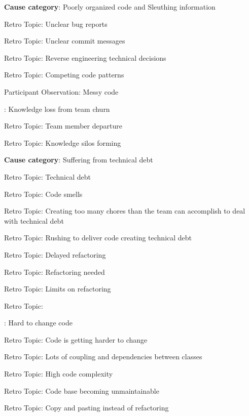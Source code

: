 \quad \quad \textbf{Cause category}: Poorly organized code and Sleuthing information

\quad \quad \quad Retro Topic: Unclear bug reports

\quad \quad \quad Retro Topic: Unclear commit messages

\quad \quad \quad Retro Topic: Reverse engineering technical decisions

\quad \quad \quad Retro Topic: Competing code patterns

\quad \quad \quad Participant Observation: Messy code

\quad \quad {}: Knowledge loss from team churn

\quad \quad \quad Retro Topic: Team member departure

\quad \quad \quad Retro Topic: Knowledge silos forming

\quad \quad \textbf{Cause category}: Suffering from technical debt

\quad \quad \quad Retro Topic: Technical debt

\quad \quad \quad Retro Topic: Code smells

\quad \quad \quad Retro Topic: Creating too many chores than the team can accomplish to deal with technical debt

\quad \quad \quad Retro Topic: Rushing to deliver code creating technical debt

\quad \quad \quad \quad Retro Topic: Delayed refactoring

\quad \quad \quad \quad Retro Topic: Refactoring needed 

\quad \quad \quad \quad Retro Topic: Limits on refactoring

\quad \quad \quad \quad Retro Topic: 

\quad \quad {}: Hard to change code

\quad \quad \quad \quad Retro Topic: Code is getting harder to change

\quad \quad \quad \quad Retro Topic: Lots of coupling and dependencies between classes

\quad \quad \quad \quad Retro Topic: High code complexity

\quad \quad \quad \quad Retro Topic: Code base becoming unmaintainable

\quad \quad \quad \quad Retro Topic: Copy and pasting instead of refactoring


